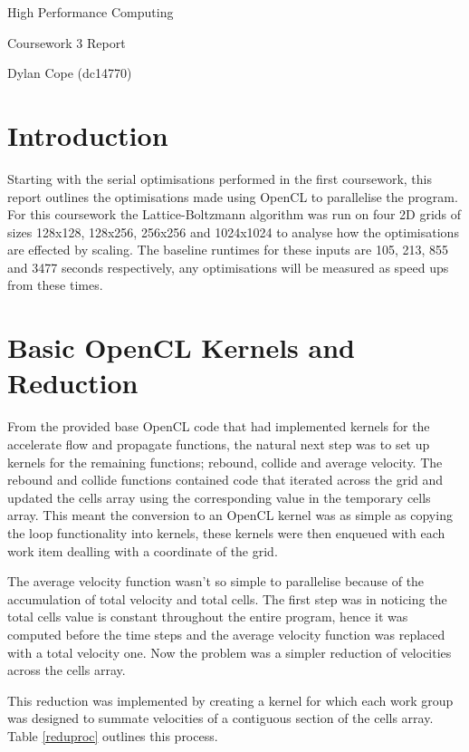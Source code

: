 \documentclass[12pt, a4paper]{article}
\begin{document}
  \vspace{.1in}
	\begin{center}
	{ \Large High Performance Computing }

  \end{center}
  \begin{center}

  Coursework 3 Report

	Dylan Cope (dc14770)

	\vspace{.1in}

	\end{center}

  \section*{Introduction}

  Starting with the serial optimisations performed in the first coursework, this report outlines the optimisations made using OpenCL to parallelise the program. For this coursework the Lattice-Boltzmann algorithm was run on four 2D grids of sizes 128x128, 128x256, 256x256 and 1024x1024 to analyse how the optimisations are effected by scaling. The baseline runtimes for these inputs are 105, 213, 855 and 3477 seconds respectively, any optimisations will be measured as speed ups from these times.
  \vspace{-.6cm}

  \section*{Basic OpenCL Kernels and Reduction}

  \begin{multicols}{2}

    From the provided base OpenCL code that had implemented kernels for the accelerate flow and propagate functions, the natural next step was to set up kernels for the remaining functions; rebound, collide and average velocity. The rebound and collide functions contained code that iterated across the grid and updated the cells array using the corresponding value in the temporary cells array. This meant the conversion to an OpenCL kernel was as simple as copying the loop functionality into kernels, these kernels were then enqueued with each work item dealling with a coordinate of the grid.

    The average velocity function wasn't so simple to parallelise because of the accumulation of total velocity and total cells. The first step was in noticing the total cells value is constant throughout the entire program, hence it was computed before the time steps and the average velocity function was replaced with a total velocity one. Now the problem was a simpler reduction of velocities across the cells array.

    This reduction was implemented by creating a kernel for which each work group was designed to summate velocities of a contiguous section of the cells array. Table \ref{reduproc} outlines this process.
  \end{multicols}
\end{document}
